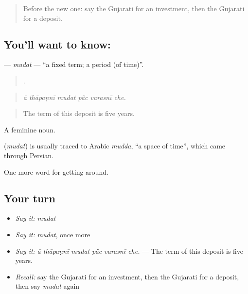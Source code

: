 \label{lesson:GU-C427-mudat}



\begin{quote}
Before the new one: say the Gujarati for an investment, then the Gujarati for a deposit.
\end{quote}

\subsection*{You'll want to know: }
\textbf{} — \emph{mudat} — \textquotedblleft{}a fixed term; a period (of time)\textquotedblright{}.

\begin{quote}
     .
\end{quote}

\begin{quote}
\emph{ā thāpaṇnī mudat pā̃c varasnī che.}
\end{quote}

\begin{quote}
The term of this deposit is five years.
\end{quote}

A feminine noun.

\begin{cousinweb}
\textbf{} (\emph{mudat}) is usually traced to Arabic \emph{mudda}, \textquotedblleft{}a space of time\textquotedblright{}, which came through Persian.
\end{cousinweb}

\begin{grammarlens}[title={What you've built}]
One more word for getting around.
\end{grammarlens}

\subsection*{Your turn}
\begin{itemize}
\raggedright
  \item \emph{Say it:} \emph{mudat}
  \item \emph{Say it:} \emph{mudat}, once more
  \item \emph{Say it:} \emph{ā thāpaṇnī mudat pā̃c varasnī che.} — The term of this deposit is five years.
  \item \emph{Recall:} say the Gujarati for an investment, then the Gujarati for a deposit, then say \emph{mudat} again
\end{itemize}

